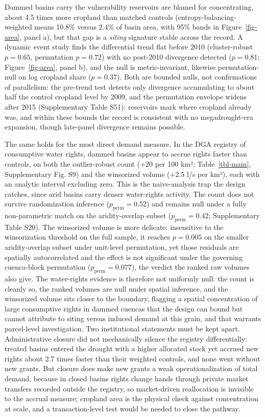 \documentclass[
]{agujournal2019}
\begin{document}
Dammed basins carry the vulnerability reservoirs are blamed for
concentrating, about 4.5 times more cropland than matched controls
(entropy-balancing-weighted means 10.8\% versus 2.4\% of basin area,
with 95\% bands in Figure~\ref{fig-area}, panel a), but that gap is a
\emph{siting} signature stable across the record. A dynamic event study
finds the differential trend flat before 2010 (cluster-robust
\(p = 0.65\), permutation \(p = 0.72\)) with no post-2010 divergence
detected (\(p = 0.81\); Figure~\ref{fig-area}, panel b), and the null is
metric-invariant, likewise permutation-null on log cropland share
(\(p = 0.37\)). Both are bounded nulls, not confirmations of
parallelism: the pre-trend test detects only divergence accumulating to
about half the control cropland level by 2009, and the permutation
envelope widens after 2015 (Supplementary Table S51): reservoirs mark
where cropland already was, and within these bounds the record is
consistent with no megadrought-era expansion, though late-panel
divergence remains possible.

The same holds for the most direct demand measure. In the DGA registry
of consumptive water rights, dammed basins appear to accrue rights
faster than controls, on both the outlier-robust count (\(+20\) per 100
km²; Table~\ref{tbl-main}, Supplementary Fig. S9) and the winsorized
volume (\(+2.5\) l/s per km²), each with an analytic interval excluding
zero. This is the naive-analysis trap the design catches, since arid
basins carry denser water-rights activity. The count does not survive
randomization inference (\(p_{\text{perm}} = 0.52\)) and remains null
under a fully non-parametric match on the aridity-overlap subset
(\(p_{\text{perm}} = 0.42\); Supplementary Table S20). The winsorized
volume is more delicate: insensitive to the winsorization threshold on
the full sample, it reaches \(p = 0.005\) on the smaller aridity-overlap
subset under unit-level permutation, yet those residuals are spatially
autocorrelated and the effect is not significant under the governing
cuenca-block permutation (\(p_{\text{perm}} = 0.077\)), the verdict the
ranked raw volumes also give. The water-rights evidence is therefore not
uniformly null: the count is cleanly so, the ranked volumes are null
under spatial inference, and the winsorized volume sits closer to the
boundary, flagging a spatial concentration of large consumptive rights
in dammed cuencas that the design can bound but cannot attribute to
siting versus induced demand at this grain, and that warrants
parcel-level investigation. Two institutional statements must be kept
apart. Administrative closure did not mechanically silence the registry
differentially: treated basins entered the drought with a higher
allocated stock yet accrued new rights about 2.7 times faster than their
weighted controls, and none went without new grants. But closure does
make new grants a weak operationalization of total demand, because in
closed basins rights change hands through private market transfers
recorded outside the registry, so market-driven reallocation is
invisible to the accrual measure; cropland area is the physical check
against concentration at scale, and a transaction-level test would be
needed to close the pathway.
\end{document}
